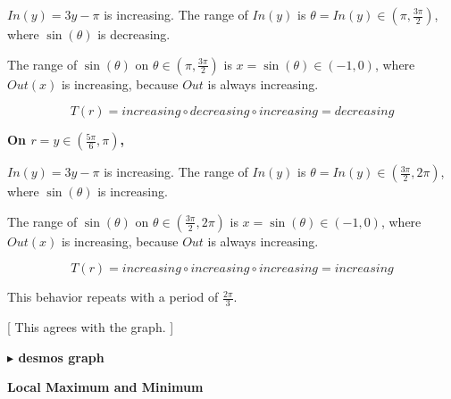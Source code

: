 \documentclass{ximera}
\begin{document}
$In(y) = 3y - \pi$ is increasing.  The range of $In(y)$ is $\theta = In(y) \in \left(\pi, \frac{3\pi}{2} \right)$, where $\sin(\theta)$ is decreasing. 



The range of $\sin(\theta)$ on $\theta \in \left( \pi, \frac{3\pi}{2} \right)$ is $x = \sin(\theta) \in (-1, 0)$, where $Out(x)$ is increasing, because $Out$ is always increasing. 


\[
T(r) = increasing \circ decreasing \circ increasing = decreasing
\]










\textbf{\textcolor{purple!80!black}{On $r = y \in \left( \frac{5\pi}{6}, \pi \right)$, }}




$In(y) = 3y - \pi$ is increasing.  The range of $In(y)$ is $\theta = In(y) \in \left( \frac{3\pi}{2}, 2\pi \right)$, where $\sin(\theta)$ is increasing. 



The range of $\sin(\theta)$ on $\theta \in \left( \frac{3\pi}{2}, 2\pi \right)$ is $x = \sin(\theta) \in (-1, 0)$, where $Out(x)$ is increasing, because $Out$ is always increasing. 


\[
T(r) = increasing \circ increasing \circ increasing = increasing
\]







This behavior repeats with a period of $\frac{2\pi}{3}$. 



[ This agrees with the graph. ]





\textbf{\textcolor{blue!55!black}{$\blacktriangleright$ desmos graph}} 
\begin{center}
\end{center}



















\textbf{\textcolor{blue!55!black}{Local Maximum and Minimum}}
\end{document}
